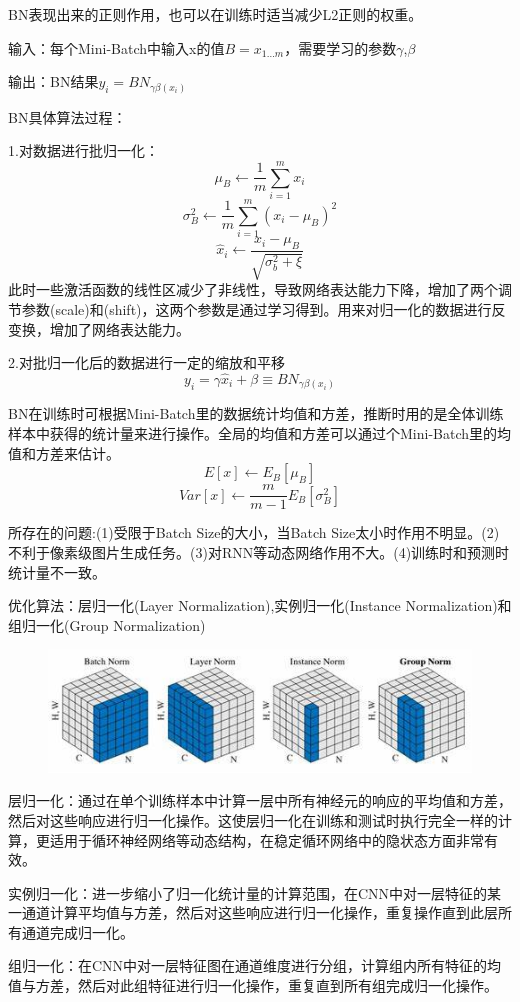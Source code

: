 \documentclass[openbib]{article}
\begin{document}
BN表现出来的正则作用，也可以在训练时适当减少L2正则的权重。


输入：每个Mini-Batch中输入x的值$B={x_{1...m}}$，需要学习的参数$\gamma$,$\beta$

输出：BN结果{$y_i = BN_{\gamma \beta(x_i)}$}

BN具体算法过程：

1.对数据进行批归一化：
$$\mu_B\gets  \frac{1}{m}\sum_{i=1}^mx_i$$
$$\sigma_B^2\gets \frac{1}{m}\sum_{i=1}^m(x_i-\mu_B)^2$$
$$\hat{x}_i\gets\frac{x_i-\mu_B}{\sqrt{\sigma_b^2+\xi}}$$
此时一些激活函数的线性区减少了非线性，导致网络表达能力下降，增加了两个调节参数(scale)和(shift)，这两个参数是通过学习得到。用来对归一化的数据进行反变换，增加了网络表达能力。

2.对批归一化后的数据进行一定的缩放和平移
$$y_i = \gamma\hat{x}_i+\beta \equiv BN_{\gamma \beta(x_i)}$$

BN在训练时可根据Mini-Batch里的数据统计均值和方差，推断时用的是全体训练样本中获得的统计量来进行操作。全局的均值和方差可以通过个Mini-Batch里的均值和方差来估计。
$$E[x] \gets E_B[\mu_B]$$
$$Var[x] \gets \frac{m}{m-1}E_B[\sigma_B^2]$$

所存在的问题:(1)受限于Batch Size的大小，当Batch Size太小时作用不明显。(2)不利于像素级图片生成任务。(3)对RNN等动态网络作用不大。(4)训练时和预测时统计量不一致。

优化算法：层归一化(Layer Normalization),实例归一化(Instance Normalization)和组归一化(Group Normalization)
\begin{figure}[htbp]
	\centering
	\includegraphics[scale=0.6]{归一化方法}
\end{figure}

层归一化：通过在单个训练样本中计算一层中所有神经元的响应的平均值和方差，然后对这些响应进行归一化操作。这使层归一化在训练和测试时执行完全一样的计算，更适用于循环神经网络等动态结构，在稳定循环网络中的隐状态方面非常有效。

实例归一化：进一步缩小了归一化统计量的计算范围，在CNN中对一层特征的某一通道计算平均值与方差，然后对这些响应进行归一化操作，重复操作直到此层所有通道完成归一化。

组归一化：在CNN中对一层特征图在通道维度进行分组，计算组内所有特征的均值与方差，然后对此组特征进行归一化操作，重复直到所有组完成归一化操作。
\end{document}
